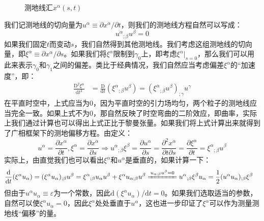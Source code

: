 \documentclass[hyperref, UTF8, a4paper]{ctexart}
\begin{document}
\begin{figure}
	\centering
	
	\caption{测地线汇$x^{\alpha }( s,t)$}
	\label{eq:geodesic_cong}
\end{figure}
我们记测地线的切向量为$u^{\alpha } \equiv \partial x^{\alpha } /\partial t$，则我们的测地线方程自然可以写成：
\begin{equation*}
	u^{\alpha }{}_{;\beta } u^{\beta } =0
\end{equation*}
如果我们固定$t$而变动$s$，我们自然得到其他测地线。我们考虑这组测地线的切向量，即$\xi ^{\alpha } \equiv \partial x^{\alpha } /\partial s$。如果我们将$\xi ^{\alpha }$限制到$\gamma _{0}$上，即考虑$\xi ^{\alpha }| _{s=0}$，那么我们可以用此来表示$\gamma _{0}$和$\gamma _{1}$之间的偏差。类比于经典情况，我们自然应当考虑偏差$\xi ^{\alpha }$的“加速度”，即：
\begin{equation*}
	\begin{aligned}
		\frac{\mathrm{D}^{2} \xi ^{\alpha }}{\mathrm{d} t^{2}} & =\frac{\mathrm{D}}{\mathrm{d} t} ( \xi ^{\alpha }{}_{;\beta } u^{\beta } )=( \xi ^{\alpha }{}_{;\beta } u^{\beta } )_{;\gamma } u^{\gamma }
	\end{aligned}
\end{equation*}
在平直时空中，上式应当为$0$，因为平直时空的引力场均匀，两个粒子的测地线应当完全一致。如果上式不为$0$，那自然反映了时空弯曲的二阶效应，即曲率，实际上我们通过计算也可以得出上式正比于黎曼张量。如果我们将上式计算出来就得到了广相框架下的测地偏移方程。由定义：
\begin{equation*}
	u^{\alpha } =\frac{\partial x^{\alpha }}{\partial t} ,\xi ^{\alpha } =\frac{\partial x^{\alpha }}{\partial s} \Rightarrow u^{\alpha }{}_{;\beta } \xi ^{\beta } =\frac{\partial u^{\alpha }}{\partial s} =\frac{\partial ^{2} x^{\alpha }}{\partial t\partial s} =\frac{\partial \xi ^{\alpha }}{\partial t} =\xi ^{\alpha }{}_{;\beta } u^{\beta }
\end{equation*}
实际上，由直觉我们也可以看出$\xi ^{\alpha }$和$u^{\alpha }$是垂直的，如果计算一下：
\begin{equation*}
	\begin{aligned}
		\frac{\mathrm{d}}{\mathrm{d} t} ( \xi ^{\alpha } u_{\alpha } ) & =(\xi ^{\alpha } u_{\alpha } )_{;\beta } u^{\beta } =\xi ^{\alpha }{}_{;\beta } u_{\alpha } u^{\beta } +\xi ^{\alpha } u_{\alpha ;\beta } u^{\beta }\xlongequal{u_{\alpha ;\beta } u^{\beta } =0} u^{\alpha }{}_{;\beta } \xi ^{\beta } u_{\alpha } =\frac{1}{2} (u^{\alpha } u_{\alpha } )_{;\beta } \xi ^{\beta }
	\end{aligned}
\end{equation*}
但由于$u^{\alpha } u_{\alpha } \equiv \varepsilon $为一个常数，因此$\mathrm{d} (\xi ^{\alpha } u_{\alpha } )/\mathrm{d} t=0$。如果我们选取适当的参数，自然可以使$\xi ^{\alpha } u_{\alpha } =0$，因此$\xi ^{\alpha }$处处垂直于$u^{\alpha }$，这也进一步印证了$\xi ^{\alpha }$可以作为测量测地线“偏移”的量。
\end{document}
